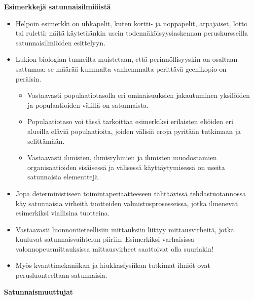 \documentclass[
]{book}
\providecommand{\tightlist}{%
  \setlength{\itemsep}{0pt}\setlength{\parskip}{0pt}}
\begin{document}
\begin{eblock}{}

\textbf{Esimerkkejä satunnaisilmiöistä}

\begin{itemize}
\tightlist
\item
  Helpoin esimerkki on uhkapelit, kuten kortti- ja noppapelit, arpajaiset, lotto tai ruletti: näitä käytetäänkin usein todennäköisyyslaskennan peruskursseilla satunnaisilmiöiden esittelyyn.
\item
  Lukion biologian tunneilta muistetaan, että perinnöllisyyskin on osaltaan sattumaa: se määrää kummalta vanhemmalta perittävä geenikopio on peräisin.

  \begin{itemize}
  \tightlist
  \item
    Vastaavasti populaatiotasolla eri ominaisuuksien jakautuminen yksilöiden ja populaatioiden välillä on satunnaista.
  \item
    Populaatiotaso voi tässä tarkoittaa esimerkiksi erilaisten eliöiden eri alueilla eläviä populaatioita, joiden välisiä eroja pyritään tutkimaan ja selittämään.
  \item
    Vastaavasti ihmisten, ihmisryhmien ja ihmisten muodostamien organisaatioiden sisäisessä ja välisessä käyttäytymisessä on useita satunnaisia elementtejä.
  \end{itemize}
\item
  Jopa deterministiseen toimintaperiaatteeseen tähtäävissä tehdastuotannossa käy satunnaisia virheitä tuotteiden valmistusprosesseissa, jotka ilmenevät esimerkiksi viallisina tuotteina.
\item
  Vastaavasti luonnontieteellisiin mittauksiin liittyy mittausvirheitä, jotka kuuluvat satunnaisvaihtelun piiriin. Esimerkiksi varhaisissa valonnopeusmittauksissa mittausvirheet saattoivat olla suuriakin!
\item
  Myös kvanttimekaniikan ja hiukkasfysiikan tutkimat ilmiöt ovat perusluonteeltaan satunnaisia.
\end{itemize}

\end{eblock}

\hfill\break
\hfill\break

\textbf{Satunnaismuuttujat}
\end{document}
